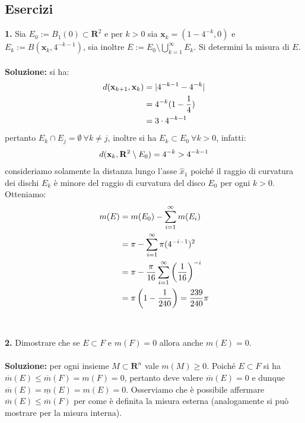 \documentclass{article}
\begin{document}
\subsection{Esercizi}
\textbf{1.} Sia $E_0 := B_1(0) \subset \mathbf{R}^2$ e per $k > 0$ sia $\mathbf{x}_k = (1 - 4^{-k}, 0)$ e $E_k := B(\mathbf{x}_k, 4^{-k-1})$, sia inoltre $E := E_0 \setminus \bigcup_{k = 1}^\infty E_k$. Si determini la misura di $E$. \\ \\
\textbf{Soluzione:} si ha:
\begin{align}
    d(\mathbf{x}_{k + 1}, \mathbf{x}_k) &= | 4^{-k - 1} - 4^{-k} | \notag \\
    &= 4^{-k}(1 - \frac{1}{4}) \notag \\
    &= 3 \cdot 4^{-k - 1} \notag
\end{align}
pertanto $E_k \cap E_j = \emptyset \ \forall k \neq j$, inoltre si ha $E_k \subset E_0 \ \forall k > 0$, infatti:
\begin{align}
    d(\mathbf{x}_k, \mathbf{R}^2 \setminus E_0) = 4^{-k} > 4^{-k - 1} \notag
\end{align}
consideriamo solamente la distanza lungo l'asse $\hat{x}_1$ poiché il raggio di curvatura dei dischi $E_k$ è minore del raggio di curvatura del disco $E_0$ per ogni $k > 0$. Otteniamo:
\begin{align}
    m(E) &= m(E_0) - \sum_{i = 1}^\infty m(E_i) \notag \\
    &= \pi - \sum_{i = 1}^\infty \pi (4^{-i - 1})^2 \notag \\
    &= \pi - \frac{\pi}{16}\sum_{i = 1}^\infty \left( \frac{1}{16} \right)^{-i} \notag \\
    &= \pi \left(1 - \frac{1}{240} \right) = \frac{239}{240}\pi \notag
\end{align}
\\ \\
\textbf{2.} Dimostrare che se $E \subset F$ e $m(F) = 0$ allora anche $m(E) = 0$. \\ \\
\textbf{Soluzione:} per ogni insieme $M \subset \mathbf{R}^n$ vale $m(M) \geq 0$. Poiché $E \subset F$ si ha $\overline{m}(E) \leq \overline{m}(F) = m(F) = 0$, pertanto deve valere $\overline{m}(E) = 0$ e dunque $\overline{m}(E) = \underline{m}(E) = m(E) = 0$. Osserviamo che è possibile affermare $\overline{m}(E) \leq \overline{m}(F)$ per come è definita la misura esterna (analogamente si può mostrare per la misura interna). \\ \\ \\
\end{document}
